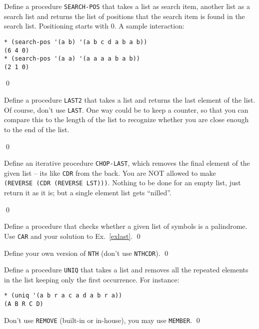 \documentclass[a4paper,11pt]{article}
\begin{document}
\begin{uexercise}
Define a procedure \Verb+SEARCH-POS+ that takes a list as search item, another list as a search list and returns the list of positions that the search item is found in the search list. Positioning starts with 0. A sample interaction:

{\small
\begin{Verbatim}
* (search-pos '(a b) '(a b c d a b a b))
(6 4 0)
* (search-pos '(a a) '(a a a a b a b))
(2 1 0)
\end{Verbatim}
}

\qed
\end{uexercise}

\begin{uexercise}
Define a procedure \Verb+LAST2+ that takes a list and returns the last element of the list. Of course, don't use \Verb+LAST+. One way could be to keep a counter, so that you can compare this to the length of the list to recognize whether you are close enough to the end of the list.

\qed
\end{uexercise}

\begin{uexercise}
Define an iterative procedure \Verb+CHOP-LAST+, which removes the final element of the given list -- its like \Verb+CDR+ from the back. You are NOT allowed to make\\ \Verb+(REVERSE (CDR (REVERSE LST)))+. Nothing to be done for an empty list, just return it as it is; but a single element list gets ``nilled''.

\qed
\end{uexercise}

\begin{uexercise}
Define a procedure that checks whether a given list of symbols is a palindrome. Use \Verb+CAR+ and your solution to Ex.\ \ref{exlast}.
\qed
\end{uexercise}

\begin{uexercise}
Define your own version of \Verb+NTH+ (don't use \Verb+NTHCDR+).
\qed
\end{uexercise}


\begin{uexercise}
\label{uniq}
Define a procedure \Verb+UNIQ+ that takes a list and removes all the repeated elements in the list keeping only the first occurrence. For instance:

\begin{Verbatim}
* (uniq '(a b r a c a d a b r a))
(A B R C D)
\end{Verbatim}

Don't use \Verb+REMOVE+ (built-in or in-house), you may use \Verb+MEMBER+.
\qed
\end{uexercise}
\end{document}
